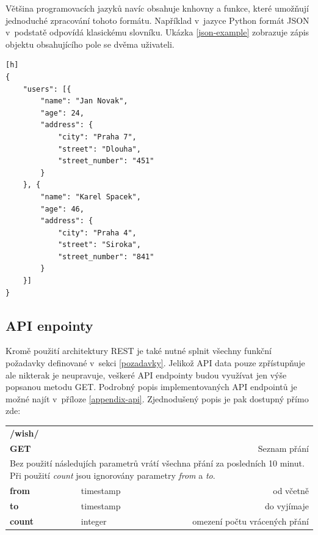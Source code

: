 \documentclass[thesis=B,czech]{FITthesis}[2012/06/26]
\begin{document}
	Většina programovacích jazyků navíc obsahuje knhovny a funkce, které umožňují jednoduché zpracování tohoto formátu. Například v~jazyce Python formát JSON v~podstatě odpovídá klasickému slovníku. Ukázka \ref{json-example} zobrazuje zápis objektu obsahujícího pole se dvěma uživateli. 
\begin{lstlisting}[caption={JSON obsahující pole se dvěma uživateli},label=json-example][h]
{
	"users": [{
		"name": "Jan Novak",
		"age": 24,
		"address": {
			"city": "Praha 7",
			"street": "Dlouha",
			"street_number": "451"
		}
	}, {
		"name": "Karel Spacek",
		"age": 46,
		"address": {
			"city": "Praha 4",
			"street": "Siroka",
			"street_number": "841"
		}
	}]
}
\end{lstlisting}
	
\subsection{API enpointy}
	Kromě použití architektury REST je také nutné splnit všechny funkční požadavky definované v~sekci \ref{pozadavky}. Jelikož API data pouze zpřístupňuje ale nikterak je neupravuje, veškeré API endpointy budou využívat jen výše popsanou metodu GET. Podrobný popis implementovaných API endpointů je možné najít v~příloze \ref{appendix-api}. Zjednodušený popis je pak dostupný přímo zde: 
	

\begin{table}[h]
\begin{tabular}{llllr}
\rowcolor[HTML]{EFEFEF}
\large \textbf{/wish/}        &         &                 &        & \multicolumn{1}{l}{}                \\
\rowcolor[HTML]{EFEFEF}
\textbf{GET}          &         &                 &        & Seznam přání                        \\
\multicolumn{5}{l}{\parbox[t]{12.8cm}{Bez použití následujích parametrů vrátí všechna přání za posledních 10 minut. Při použití \textit{count} jsou ignorovány parametry  \textit{from} a \textit{to}.}  } \\
\textbf{from}         &         & timestamp       &        & od včetně                           \\
\textbf{to}           &         & timestamp       &        & do vyjímaje                         \\
\textbf{count}        &         & integer         &        & omezení počtu vrácených přání      \\
\end{tabular}
\end{table}
\end{document}
